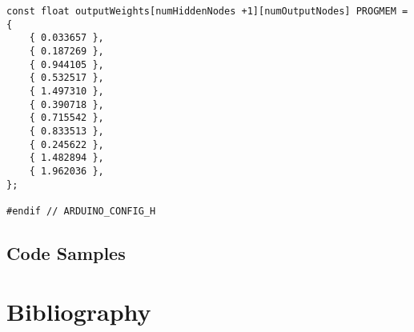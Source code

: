 \documentclass[a4paper]{article}
\begin{document}
\begin{lstlisting}
const float outputWeights[numHiddenNodes +1][numOutputNodes] PROGMEM = {
    { 0.033657 }, 
    { 0.187269 }, 
    { 0.944105 }, 
    { 0.532517 }, 
    { 1.497310 }, 
    { 0.390718 }, 
    { 0.715542 }, 
    { 0.833513 }, 
    { 0.245622 }, 
    { 1.482894 }, 
    { 1.962036 }, 
};

#endif // ARDUINO_CONFIG_H
\end{lstlisting}


\subsection{Code Samples}%



\newpage
\section{Bibliography}
\end{document}
